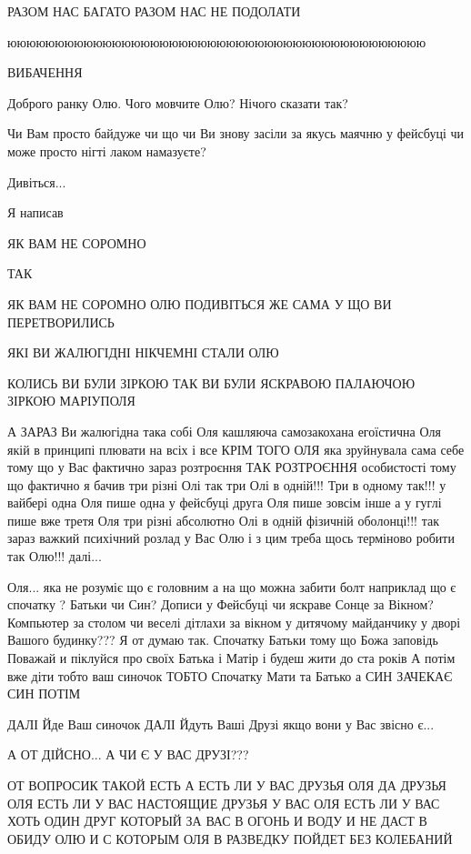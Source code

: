 РАЗОМ НАС БАГАТО РАЗОМ НАС НЕ ПОДОЛАТИ

юююююююююююююююююююююююююююююююююююююююююююю

ВИБАЧЕННЯ

Доброго ранку Олю. Чого мовчите Олю? Нічого сказати так?

Чи Вам просто байдуже чи що чи Ви знову засіли за якусь маячню у фейсбуці 
чи може просто нігті лаком намазуєте? 

Дивіться...

Я написав

ЯК ВАМ НЕ СОРОМНО

ТАК

ЯК ВАМ НЕ СОРОМНО ОЛЮ ПОДИВІТЬСЯ ЖЕ САМА У ЩО ВИ ПЕРЕТВОРИЛИСЬ

ЯКІ ВИ ЖАЛЮГІДНІ НІКЧЕМНІ СТАЛИ ОЛЮ

КОЛИСЬ ВИ БУЛИ ЗІРКОЮ ТАК ВИ БУЛИ ЯСКРАВОЮ ПАЛАЮЧОЮ ЗІРКОЮ МАРІУПОЛЯ

А ЗАРАЗ
  Ви 
	  жалюгідна така собі Оля кашляюча самозакохана егоїстична Оля 
		   якій в принципі плювати на всіх і все
КРІМ ТОГО
  ОЛЯ яка зруйнувала сама себе 
	  тому що у Вас фактично зараз розтроєння ТАК РОЗТРОЄННЯ особистості
		   тому що фактично я бачив три різні Олі 
			    так три Олі в одній!!! Три в одному так!!!
					   у вайбері одна Оля пише одна
						   у фейсбуці друга Оля пише зовсім інше
							   а у гуглі пише вже третя Оля
								   три різні абсолютно Олі в одній фізичній оболонці!!!
					так зараз важкий психічний розлад у Вас Олю і з цим треба щось 
					  терміново робити так Олю!!!
	  далі...

    Оля...
	  яка не розуміє що є головним а на що можна забити болт
		  наприклад 
			  що є спочатку ? Батьки чи Син? Дописи у Фейсбуці чи яскраве Сонце за Вікном?
				   Компьютер за столом чи веселі дітлахи за вікном у дитячому майданчику 
					   у дворі Вашого будинку???
Я от думаю так.
  Спочатку Батьки тому що Божа заповідь
	   Поважай и піклуйся про своїх Батька і Матір і будеш жити до ста років
		   А потім вже діти тобто ваш синочок
			   ТОБТО
				   Спочатку Мати та Батько а СИН ЗАЧЕКАЄ СИН ПОТІМ

	ДАЛІ
	  Йде Ваш синочок
	ДАЛІ
	  Йдуть Ваші Друзі якщо вони у Вас звісно є...

А ОТ ДІЙСНО...
  А ЧИ Є У ВАС ДРУЗІ???

ОТ ВОПРОСИК ТАКОЙ ЕСТЬ А ЕСТЬ ЛИ У ВАС ДРУЗЬЯ ОЛЯ
  ДА ДРУЗЬЯ ОЛЯ 
	  ЕСТЬ ЛИ У ВАС НАСТОЯЩИЕ ДРУЗЬЯ
		  У ВАС ОЛЯ ЕСТЬ ЛИ У ВАС ХОТЬ ОДИН ДРУГ
			   КОТОРЫЙ ЗА ВАС В ОГОНЬ И ВОДУ 
				   И НЕ ДАСТ В ОБИДУ ОЛЮ
             И С КОТОРЫМ ОЛЯ В РАЗВЕДКУ ПОЙДЕТ БЕЗ КОЛЕБАНИЙ

